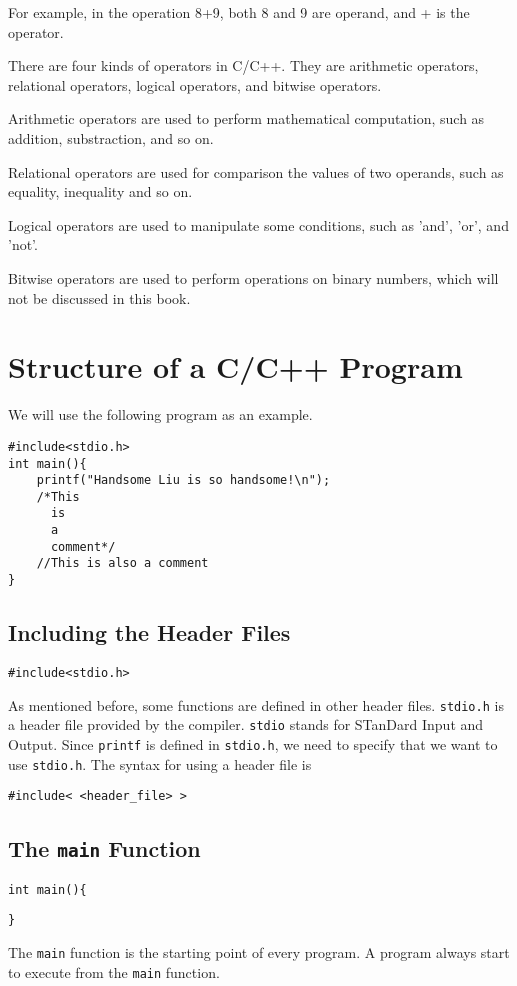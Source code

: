 \documentclass{report}
\begin{document}
    For example, in the operation 8+9, both 8 and 9 are operand, and + is the operator.

    There are four kinds of operators in C/C++. They are arithmetic operators, relational operators, logical operators, and bitwise operators.

    Arithmetic operators are used to perform mathematical computation, such as addition, substraction, and so on.

    Relational operators are used for comparison the values of two operands, such as equality, inequality and so on.

    Logical operators are used to manipulate some conditions, such as 'and', 'or', and 'not'.

    Bitwise operators are used to perform operations on binary numbers, which will not be discussed in this book.

\chapter{Structure of a C/C++ Program}
We will use the following program as an example.
\begin{lstlisting}[style=CStyle]
#include<stdio.h>
int main(){
    printf("Handsome Liu is so handsome!\n");
    /*This
      is
      a
      comment*/
    //This is also a comment
}
\end{lstlisting}

\section{Including the Header Files}
\begin{lstlisting}[style=CStyle]
#include<stdio.h>
\end{lstlisting}
As mentioned before, some functions are defined in other header files. \texttt{stdio.h} is a header file provided by the compiler. \texttt{stdio} stands for STanDard Input and Output. Since \texttt{printf} is defined in \texttt{stdio.h}, we need to specify that we want to use \texttt{stdio.h}. The syntax for using a header file is
\begin{center}\texttt{\#include< <header\_file> >}\end{center}
\section{The \texttt{main} Function}
\begin{lstlisting}[style=CStyle,firstnumber=2]
int main(){
\end{lstlisting}
\begin{lstlisting}[style=CStyle,firstnumber=9]
}
\end{lstlisting}
The \texttt{main} function is the starting point of every program. A program always start to execute from the \texttt{main} function.
\end{document}

